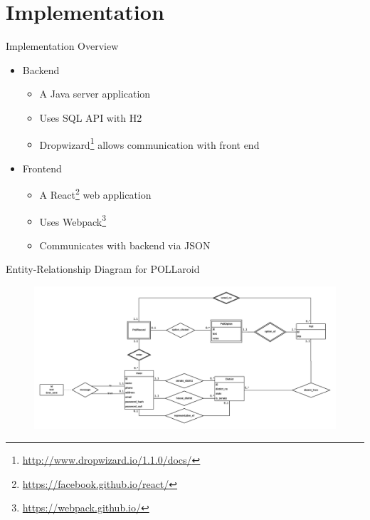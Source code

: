 \documentclass[11pt,aps,prb,groupedaddress,nofootinbib,floatfix]{beamer}
\newcommand{\pollaroid}{POLLaroid}
\begin{document}
\section{Implementation}

%
%
\begin{frame}{Implementation Overview}
\begin{itemize}
	\item Backend
	\begin{itemize}
		\item A Java server application
		\item Uses SQL API with H2
		\item Dropwizard\footnote{\url{http://www.dropwizard.io/1.1.0/docs/}} allows communication with front end
	\end{itemize}
	\item Frontend
	\begin{itemize}
		\item A React\footnote{\url{https://facebook.github.io/react/}} web application
		\item Uses Webpack\footnote{\url{https://webpack.github.io/}}
		\item Communicates with backend via JSON
	\end{itemize}
\end{itemize}
\end{frame}


%
%
\begin{frame}{Entity-Relationship Diagram for \pollaroid}
\begin{center}
\begin{figure}[t]
\includegraphics[scale=0.13]{er_diag.png}
\end{figure}
\end{center}
\end{frame}
\end{document}
